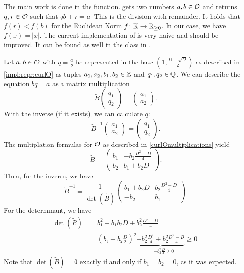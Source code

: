 The main work is done in the  function.  gets two numbers $a, b \in \mathcal{O}$ and returns $q, r \in \mathcal{O}$ such that $q b + r = a$. This is the division with remainder. It holds that $f(r) < f(b)$ for the Euclidean Norm $f \colon \mathbb{K} \rightarrow \mathbb{R}_{\ge 0}$. In our case, we have $f(x) = |x|$. The current implementation of  is very naive and should be improved. It can be found as well in the class  in .

Let $a,b \in \mathcal{O}$ with $q = \tfrac{a}{b}$ be represented in the base $(1, \frac{D + \sqrt{D}} {2})$ as described in \cref{impl:repr:curlO} as tuples $a_1,a_2,b_1,b_2 \in \mathbb{Z}$ and $q_1,q_2 \in \mathbb{Q}$. We can describe the equation $bq = a$ as a matrix multiplication
\[ \tilde{B} \begin{pmatrix} q_1 \\ q_2 \end{pmatrix} = \begin{pmatrix} a_1 \\ a_2 \end{pmatrix} . \]
With the inverse (if it exists), we can calculate $q$:
\[ \tilde{B}^{-1} \begin{pmatrix} a_1 \\ a_2 \end{pmatrix} = \begin{pmatrix} q_1 \\ q_2 \end{pmatrix} . \]
The multiplation formulas for $\mathcal{O}$ as described in \cref{curlOmultiplications} yield
\[ \tilde{B} = \begin{pmatrix}
b_1 & -b_2 \frac{D^2 - D}{4} \\
b_2 & b_1 + b_2 D
\end{pmatrix} . \]
Then, for the inverse, we have
\[ \tilde{B}^{-1} = \frac{1}{\det(\tilde{B})}
\begin{pmatrix}
b_1 + b_2 D & b_2 \frac{D^2 - D}{4} \\
-b_2 & b_1
\end{pmatrix} . \]
For the determinant, we have
\begin{align*}
\det(\tilde{B}) &= b_1^2 + b_1 b_2 D + b_2^2 \frac{D^2-D}{4} \\
&= (b_1 + b_2 \tfrac{D}{2})^2 \underbrace{- b_2^2 \tfrac{D^2}{4} + b_2^2 \tfrac{D^2-D}{4}}_{
= -b_2^2 \tfrac{D}{4} \ge 0} \ge 0.
\end{align*}
Note that $\det(\tilde{B}) = 0$ exactly if and only if $b_1 = b_2 = 0$, as it was expected.

